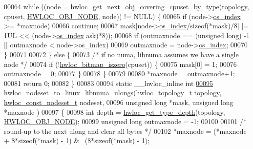 \begin{DoxyCode}
00064     \textcolor{keywordflow}{while} ((node = \hyperlink{a00056_ga5915ea30f326676b3a4cfff371ce04d1}{hwloc_get_next_obj_covering_cpuset_by_type}(topology, cpuset, 
      \hyperlink{a00041_ggacd37bb612667dc437d66bfb175a8dc55aaf0964881117bdedf1a5e9332cd120dd}{HWLOC_OBJ_NODE}, node)) != NULL) \{
00065       \textcolor{keywordflow}{if} (node->\hyperlink{a00016_a61a7a80a68eaccbaaa28269e678c81a9}{os_index} >= *maxnode)
00066         \textcolor{keywordflow}{continue};
00067       mask[node->\hyperlink{a00016_a61a7a80a68eaccbaaa28269e678c81a9}{os_index}/\textcolor{keyword}{sizeof}(*mask)/8] |= 1UL << (node->\hyperlink{a00016_a61a7a80a68eaccbaaa28269e678c81a9}{os_index} %
      ask)*8));
00068       \textcolor{keywordflow}{if} (outmaxnode == (\textcolor{keywordtype}{unsigned} \textcolor{keywordtype}{long}) -1 || outmaxnode < node->os\_index)
00069         outmaxnode = node->\hyperlink{a00016_a61a7a80a68eaccbaaa28269e678c81a9}{os_index};
00070     \}
00071 
00072   \} \textcolor{keywordflow}{else} \{
00073     \textcolor{comment}{/* if no numa, libnuma assumes we have a single node */}
00074     \textcolor{keywordflow}{if} (!\hyperlink{a00065_gaa94fed35d2a598bc4a8657b6955b7bf5}{hwloc_bitmap_iszero}(cpuset)) \{
00075       mask[0] = 1;
00076       outmaxnode = 0;
00077     \}
00078   \}
00079 
00080   *maxnode = outmaxnode+1;
00081   \textcolor{keywordflow}{return} 0;
00082 \}
00083 
00094 \textcolor{keyword}{static} \_\_hwloc\_inline \textcolor{keywordtype}{int}
\hypertarget{a00034_source_l00095}{}\hyperlink{a00068_gaf213df50d229c5d17a5a56b5d8f10b74}{00095} \hyperlink{a00068_gaf213df50d229c5d17a5a56b5d8f10b74}{hwloc_nodeset_to_linux_libnuma_ulongs}(\hyperlink{a00039_ga9d1e76ee15a7dee158b786c30b6a6e38}{hwloc_topology_t} topology, 
      \hyperlink{a00040_ga2f5276235841ad66a79bedad16a5a10c}{hwloc_const_nodeset_t} nodeset,
00096                                       \textcolor{keywordtype}{unsigned} \textcolor{keywordtype}{long} *mask, \textcolor{keywordtype}{unsigned} \textcolor{keywordtype}{long} *maxnode
      )
00097 \{
00098   \textcolor{keywordtype}{int} depth = \hyperlink{a00046_gaea7c64dd59467f5201ba87712710b14d}{hwloc_get_type_depth}(topology, \hyperlink{a00041_ggacd37bb612667dc437d66bfb175a8dc55aaf0964881117bdedf1a5e9332cd120dd}{HWLOC_OBJ_NODE});
00099   \textcolor{keywordtype}{unsigned} \textcolor{keywordtype}{long} outmaxnode = -1;
00100 
00101   \textcolor{comment}{/* round-up to the next ulong and clear all bytes */}
00102   *maxnode = (*maxnode + 8*\textcolor{keyword}{sizeof}(*mask) - 1) & ~(8*\textcolor{keyword}{sizeof}(*mask) - 1);

\end{DoxyCode}
